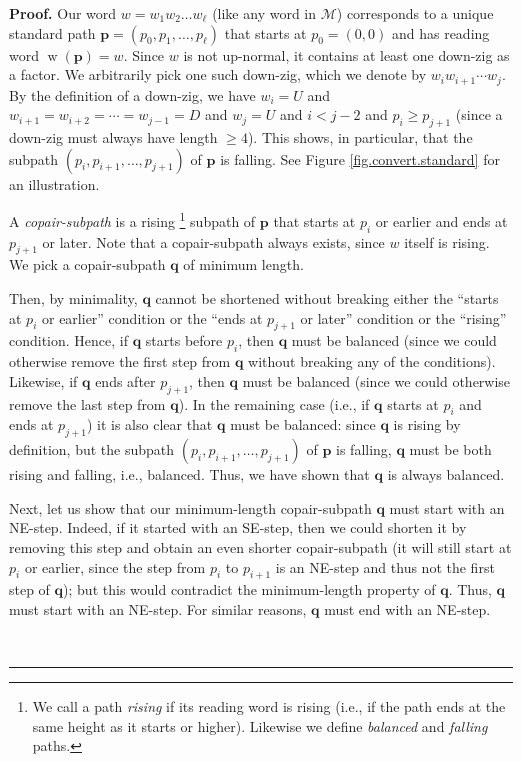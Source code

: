 \documentclass[numbers=enddot,12pt,final,onecolumn,notitlepage]{scrartcl}%
\theoremstyle{definition}
\newenvironment{proof}[1][Proof]{\noindent\textbf{#1.} }{\ \rule{0.5em}{0.5em}}
\newcommand{\M}{\mathcal{M}}
\newcommand{\pp}{\mathbf{p}}
\newcommand{\qq}{\mathbf{q}}
\newcommand{\w}{\operatorname{w}}
\newcommand{\tup}[1]{\left( #1 \right)}
\newenvironment{vershort}{}{}
\begin{document}
\begin{vershort}
\begin{proof}
Our word $w = w_1 w_2 \ldots w_\ell$ (like any word in $\M$) corresponds to a unique standard path $\pp = \tup{p_0, p_1, \dots, p_\ell}$ that starts at $p_0=\tup{0, 0}$ and has reading word $\w\tup{\pp} = w$. Since $w$ is not up-normal, it contains at least one down-zig as a
factor. We arbitrarily pick one such down-zig, which we denote by $w_{i}w_{i+1}\cdots w_{j}$.
By the definition of a down-zig, we have $w_{i}=U$ and
$w_{i+1}=w_{i+2}=\cdots=w_{j-1}=D$ and $w_{j}=U$ and
$i<j-2$ and $p_{i}\geq p_{j+1}$ (since a
down-zig must always have length $\geq4$).
This shows, in particular, that the subpath $\tup{p_i, p_{i+1}, \ldots, p_{j+1}}$ of $\pp$ is falling.
See Figure \ref{fig.convert.standard} for an illustration.

A \emph{copair-subpath} is a rising%
\footnote{We call a path \emph{rising} if its reading word is rising (i.e., if the path ends at the same height as it starts or higher).
Likewise we define \emph{balanced} and \emph{falling} paths.}
subpath of $\pp$ that starts at $p_{i}$ or earlier and ends at $p_{j+1}$ or later. Note that a copair-subpath always exists, since $w$ itself is rising.
We pick a copair-subpath $\qq$ of minimum length.

Then, by minimality, $\qq$ cannot be shortened without breaking either the ``starts at $p_{i}$ or earlier'' condition or the ``ends at $p_{j+1}$ or later'' condition or the ``rising'' condition.
Hence, if $\qq$ starts before $p_i$, then $\qq$ must be balanced (since we could otherwise remove the first step from $\qq$ without breaking any of the conditions).
Likewise, if $\qq$ ends after $p_{j+1}$, then $\qq$ must be balanced (since we could otherwise remove the last step from $\qq$).
In the remaining case (i.e., if $\qq$ starts at $p_i$ and ends at $p_{j+1}$) it is also clear that $\qq$ must be balanced:
since $\qq$ is rising by definition, but the subpath $\tup{p_i, p_{i+1}, \ldots, p_{j+1}}$ of $\pp$ is falling, $\qq$ must be both rising and falling, i.e., balanced.
Thus, we have shown that $\qq$ is always balanced.

Next, let us show that our minimum-length copair-subpath $\qq$ must start with an NE-step. Indeed, if it started with an SE-step, then we could shorten it by removing this step and obtain an even shorter copair-subpath (it will still start at $p_i$ or earlier, since the step from $p_{i}$ to $p_{i+1}$ is an NE-step and thus not the first step of $\qq$); but this would contradict the minimum-length property of $\qq$.
Thus, $\qq$ must start with an NE-step.
For similar reasons, $\qq$ must end with an NE-step.


\end{proof}
\end{vershort}
\end{document}
